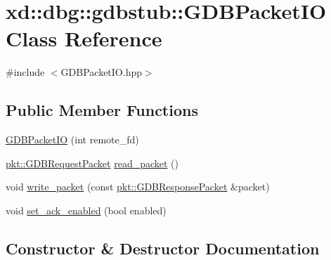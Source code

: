 \hypertarget{classxd_1_1dbg_1_1gdbstub_1_1_g_d_b_packet_i_o}{}\section{xd\+:\+:dbg\+:\+:gdbstub\+:\+:G\+D\+B\+Packet\+IO Class Reference}
\label{classxd_1_1dbg_1_1gdbstub_1_1_g_d_b_packet_i_o}


{\ttfamily \#include $<$G\+D\+B\+Packet\+I\+O.\+hpp$>$}

\subsection*{Public Member Functions}
\begin{DoxyCompactItemize}
\item 
\mbox{\hyperlink{classxd_1_1dbg_1_1gdbstub_1_1_g_d_b_packet_i_o_a5355327853e4b52bf18b3dda07372d5c}{G\+D\+B\+Packet\+IO}} (int remote\+\_\+fd)
\item 
\mbox{\hyperlink{namespacexd_1_1dbg_1_1gdbstub_1_1pkt_a65690974f9b6e8807842c637042664a6}{pkt\+::\+G\+D\+B\+Request\+Packet}} \mbox{\hyperlink{classxd_1_1dbg_1_1gdbstub_1_1_g_d_b_packet_i_o_a570e9125fc6b4a79d097c17109de2b29}{read\+\_\+packet}} ()
\item 
void \mbox{\hyperlink{classxd_1_1dbg_1_1gdbstub_1_1_g_d_b_packet_i_o_a40341bea13824906882825ddf2474c93}{write\+\_\+packet}} (const \mbox{\hyperlink{classxd_1_1dbg_1_1gdbstub_1_1pkt_1_1_g_d_b_response_packet}{pkt\+::\+G\+D\+B\+Response\+Packet}} \&packet)
\item 
void \mbox{\hyperlink{classxd_1_1dbg_1_1gdbstub_1_1_g_d_b_packet_i_o_a5fa00e52b42fc93b3bbe1719ba2e7888}{set\+\_\+ack\+\_\+enabled}} (bool enabled)
\end{DoxyCompactItemize}


\subsection{Constructor \& Destructor Documentation}
\mbox{\label{classxd_1_1dbg_1_1gdbstub_1_1_g_d_b_packet_i_o_a5355327853e4b52bf18b3dda07372d5c}} 
